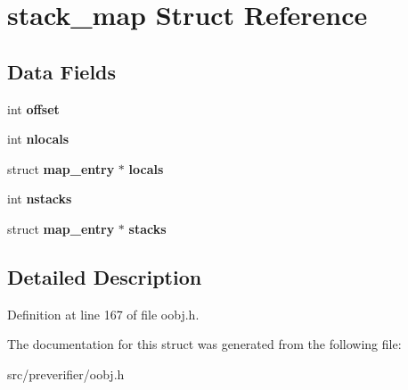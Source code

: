 \section{stack\_\-map Struct Reference}
\label{structstack__map}
\subsection*{Data Fields}
\begin{DoxyCompactItemize}
\item 
int {\bfseries offset}\label{structstack__map_a5131f555c6a17bd845e2a78b2a3d26de}

\item 
int {\bfseries nlocals}\label{structstack__map_a6fd2efeff8c29ea612278c6c17e7d045}

\item 
struct {\bf map\_\-entry} $\ast$ {\bfseries locals}\label{structstack__map_a1031f6ade454c3a3f91da9d5a0df85a4}

\item 
int {\bfseries nstacks}\label{structstack__map_aba0e9c96e7f0305395535dd072bcfa3b}

\item 
struct {\bf map\_\-entry} $\ast$ {\bfseries stacks}\label{structstack__map_a3cd759ee282815143403bce0927efb4c}

\end{DoxyCompactItemize}


\subsection{Detailed Description}


Definition at line 167 of file oobj.h.



The documentation for this struct was generated from the following file:\begin{DoxyCompactItemize}
\item 
src/preverifier/oobj.h\end{DoxyCompactItemize}
